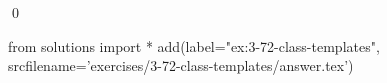 
\begin{ex}
  \label{ex:3-72-class-templates}
  
  \qed
\end{ex}
\begin{python0}
from solutions import *
add(label="ex:3-72-class-templates",
    srcfilename='exercises/3-72-class-templates/answer.tex')
\end{python0}

